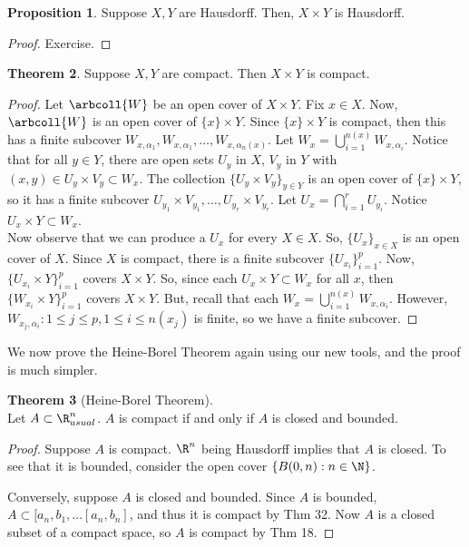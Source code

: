 \documentclass[a5paper]{article}
\theoremstyle{definition}%
\newtheorem{theorem}{Theorem}
\newtheorem{proposition}[theorem]{Proposition}
\numberwithin{exercise}{section}
\theoremstyle{remark}%
\begin{document}
\begin{highlight}
\begin{proposition}
Suppose $X,Y$ are Hausdorff. Then, $X\times Y$ is Hausdorff. 
\end{proposition}
\end{highlight}
\begin{proof}
Exercise.
\end{proof}

\begin{highlight}
\begin{theorem}
Suppose $X,Y$ are compact. Then $X\times Y$ is compact. 
\end{theorem}
\end{highlight}
\begin{proof}
Let $\arbcoll{W}$ be an open cover of $X\times Y$. Fix $x\in X$. Now, $\arbcoll{W}$ is an open cover of $\{x\}\times Y$. Since $\{x\}\times Y$ is compact, then this has a finite subcover $W_{x,\alpha_1}, W_{x,\alpha_1}, \ldots, W_{x,\alpha_n(x)}$. Let $W_x=\bigcup_{i=1}^{n(x)} W_{x,\alpha_i}$. Notice that for all $y\in Y$, there are open sets $U_y$ in $X$, $V_y$ in $Y$ with $(x,y)\in U_y\times V_y\subset W_x$. The collection $\{U_y\times V_y\}_{y\in Y}$ is an open cover of $\{x\}\times Y$, so it has a finite subcover $U_{y_1}\times V_{y_1}, \ldots, U_{y_r}\times V_{y_r}$. Let $U_x=\bigcap_{i=1}^r U_{y_i}$. Notice $U_x\times Y \subset W_x$.\\

Now observe that we can produce a $U_x$ for every $X\in X$. So, $\{U_x\}_{x\in X}$ is an open cover of $X$. Since $X$ is compact, there is a finite subcover $\{U_{x_i}\}_{i=1}^p$. Now, $\{U_{x_i}\times Y\}_{i=1}^p$ covers $X\times Y$. So, since each $U_x\times Y \subset W_x$ for all $x$, then $\{W_{x_i}\times Y\}_{i=1}^p$ covers $X\times Y$. But, recall that each $W_{x}=\bigcup_{i=1}^{n(x)} W_{x,\alpha_i}$. However, ${W_{x_j,\alpha_i} : 1\leq j \leq p, 1\leq i\leq n(x_j)}$ is finite, so we have a finite subcover. 
\end{proof}

We now prove the Heine-Borel Theorem again using our new tools, and the proof is much simpler. 
\begin{theorem}[Heine-Borel Theorem]\mbox{}\\
Let $A\subset\R^n_{usual}$. $A$ is compact if and only if $A$ is closed and bounded. 
\end{theorem}
\begin{proof}
Suppose $A$ is compact. $\R^n$ being Hausdorff implies that $A$ is closed. To see that it is bounded, consider the open cover $\{B(0,n):n\in\N\}$. 

Conversely, suppose $A$ is closed and bounded. Since $A$ is bounded, $A\subset [a_n,b_1, \ldots [a_n,b_n]$, and thus it is compact by Thm 32. Now $A$ is a closed subset of a compact space, so $A$ is compact by Thm 18. 
\end{proof}
\end{document}
